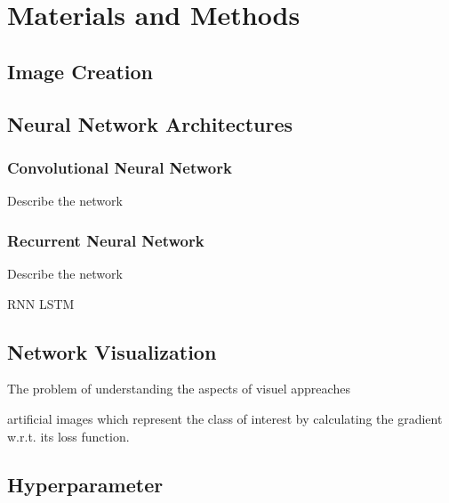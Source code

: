 \section{Materials and Methods}
\label{sec:materials_and_methods}


\subsection{Image Creation}
\subsection{Neural Network Architectures}

\subsubsection{Convolutional Neural Network}

Describe the network

\subsubsection{Recurrent Neural Network}

Describe the network

RNN LSTM

\subsection{Network Visualization}

The problem of understanding the aspects of visuel appreaches


artificial images which represent the class of interest by calculating the gradient w.r.t. its loss function. 

\subsection{Hyperparameter}
